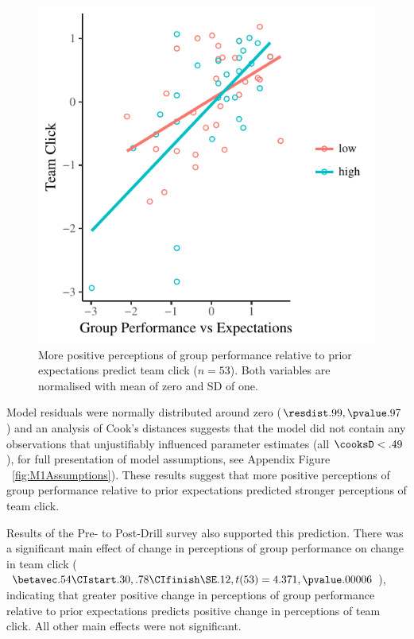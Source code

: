 \begin{figure}
    \centering
    \includegraphics[width=0.5\linewidth,keepaspectratio] {images/teamPerfExpClickScatter-1}
    \caption{More positive perceptions of group performance relative to prior expectations predict team click ($n = 53$).  Both  variables are normalised with mean of zero and SD of one.}
    \label{fig:teamPerfExpClickScatter}
\end{figure}

Model residuals were normally distributed around zero ($\resdist .99, \pvalue .97 $) and an analysis of Cook's distances suggests that the model did not contain any observations that unjustifiably influenced parameter estimates (all $\cooksD < .49$), for full presentation of model assumptions, see Appendix Figure ~\ref{fig:M1Assumptions}).  These results suggest that more positive perceptions of group performance relative to prior expectations predicted stronger perceptions of team click.


Results of the Pre- to Post-Drill survey also supported this prediction.  There was a significant main effect of change in perceptions of group performance on change in team click ($\betavec .54 \CIstart .30, .78 \CIfinish \SE .12, t(53) = 4.371, \pvalue .00006$), indicating that greater positive change in perceptions of group performance relative to prior expectations predicts positive change in perceptions of team click.  All other main effects were not significant.

